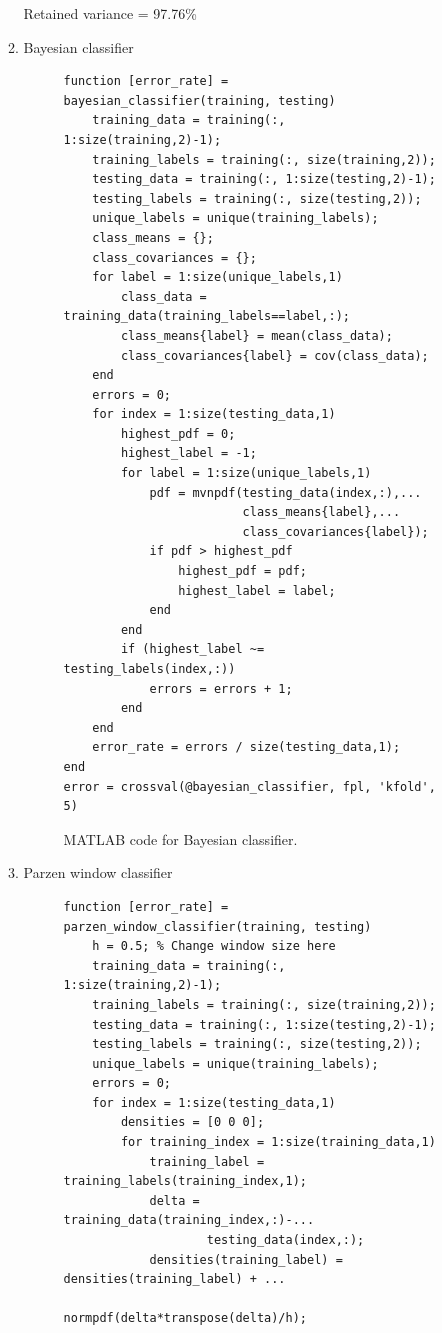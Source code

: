 \documentclass[12pt]{article}
\begin{document}
\begin{enumerate}
\begin{enumerate}
Retained variance = 97.76\%
\item Bayesian classifier \\
\begin{figure}[H]
\begin{verbatim}
function [error_rate] = bayesian_classifier(training, testing)
    training_data = training(:, 1:size(training,2)-1);
    training_labels = training(:, size(training,2));
    testing_data = training(:, 1:size(testing,2)-1);
    testing_labels = training(:, size(testing,2));
    unique_labels = unique(training_labels);
    class_means = {};
    class_covariances = {};
    for label = 1:size(unique_labels,1)
        class_data = training_data(training_labels==label,:);
        class_means{label} = mean(class_data);
        class_covariances{label} = cov(class_data);
    end
    errors = 0;
    for index = 1:size(testing_data,1)
        highest_pdf = 0;
        highest_label = -1;
        for label = 1:size(unique_labels,1)
            pdf = mvnpdf(testing_data(index,:),...
                         class_means{label},...
                         class_covariances{label});
            if pdf > highest_pdf
                highest_pdf = pdf;
                highest_label = label;
            end
        end
        if (highest_label ~= testing_labels(index,:))
            errors = errors + 1;
        end
    end
    error_rate = errors / size(testing_data,1);    
end
error = crossval(@bayesian_classifier, fpl, 'kfold', 5)
\end{verbatim}
\caption{MATLAB code for Bayesian classifier.}
\end{figure}
\newpage
\item Parzen window classifier
\begin{figure}[H]
\begin{verbatim}
function [error_rate] = parzen_window_classifier(training, testing)
    h = 0.5; % Change window size here
    training_data = training(:, 1:size(training,2)-1);
    training_labels = training(:, size(training,2));
    testing_data = training(:, 1:size(testing,2)-1);
    testing_labels = training(:, size(testing,2));
    unique_labels = unique(training_labels);
    errors = 0;
    for index = 1:size(testing_data,1)
        densities = [0 0 0];
        for training_index = 1:size(training_data,1)
            training_label = training_labels(training_index,1);
            delta = training_data(training_index,:)-...
                    testing_data(index,:);
            densities(training_label) = densities(training_label) + ...
                                        normpdf(delta*transpose(delta)/h);

\end{verbatim}
\end{figure}
\end{enumerate}
\end{enumerate}
\end{document}
